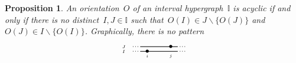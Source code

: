 \documentclass[reqno]{amsart}
\newtheorem{proposition}[theorem]{Proposition}
\theoremstyle{definition}
\newcommand{\I}{\mathbb{I}} %
\newcommand{\ssm}{\smallsetminus} %
\newcommand{\II}{\mathbb I} %
\begin{document}
\begin{proposition}
\label{prop:acyclicI}
An orientation~$O$ of an interval hypergraph~$\II$ is acyclic if and only if there is no distinct~$I,J \in \I$ such that~$O(I) \in J \ssm \{O(J)\}$ and~$O(J) \in I \ssm \{O(I)\}$.
Graphically, there is no pattern
 \[
	\begin{tikzpicture}[scale=1,baseline=.0cm]
	\node at (-.5,0.2) {$\scriptscriptstyle J$}; 
	\node at (-.1,0.2) {$\scriptstyle \cdot$};
	\node at (0,0.2) {$\scriptstyle \cdot$};
	\node at (.1,0.2) {$\scriptstyle \cdot$};
	\draw [thick] (.2,.2)--(1.8,.2);
	\node at (1.9,.2) {$\scriptstyle \cdot$};
	\node at (2,.2) {$\scriptstyle \cdot$};
	\node at (2.1,.2) {$\scriptstyle \cdot$};
	\node at (1.5,.2) {$\bullet$};
	\node at (-.5,0) {$\scriptscriptstyle I$};
	\node at (-.1,0) {$\scriptstyle \cdot$};
	\node at (0,0) {$\scriptstyle \cdot$};
	\node at (.1,0) {$\scriptstyle \cdot$};
	\draw [thick] (.2,0)--(1.8,0);
	\node at (1.9,0) {$\scriptstyle \cdot$};
	\node at (2,0) {$\scriptstyle \cdot$};
	\node at (2.1,0) {$\scriptstyle \cdot$};
	\node at (.5,0) {$\bullet$};
	\node at (.5,-.2) {$\scriptscriptstyle i$};
	\node at (1.5,-.2) {$\scriptscriptstyle j$}; 
	\end{tikzpicture}
\]
\end{proposition}
\end{document}
